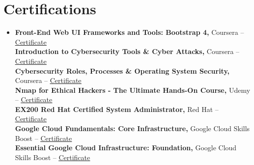 \documentclass[letterpaper,16pt]{article}
\newcommand{\resumeSubHeadingListStart}{\begin{itemize}[leftmargin=0.15in, label={}]}
\newcommand{\resumeSubHeadingListEnd}{\end{itemize}}
\begin{document}
\section{Certifications}
 \resumeSubHeadingListStart
   \item{
     \textbf{Front-End Web UI Frameworks and Tools: Bootstrap 4, }{Coursera -- \href{https://coursera.org/share/6f277b468374e3dbe6a26c67811db539}{\color{LinkCol}\underline{Certificate}}}
     \hfill \\
     \textbf{Introduction to Cybersecurity Tools \& Cyber Attacks, }{Coursera -- \href{https://coursera.org/share/317c6874e71c67cfde693de6e5de7e49}{\color{LinkCol}\underline{Certificate}}}
     \hfill \\
     \textbf{Cybersecurity Roles, Processes \& Operating System Security, }{Coursera -- \href{https://coursera.org/share/2ab125b6a50b05a2ed5eb454cce95afd}{\color{LinkCol}\underline{Certificate}}}
     \hfill \\
     \textbf{Nmap for Ethical Hackers - The Ultimate Hands-On Course, }{Udemy -- 
     \href{https://www.udemy.com/certificate/UC-bd741301-70d9-4a30-a11e-26f92aa1c287/}{\color{LinkCol}\underline{Certificate}}}
     \hfill \\
     \textbf{EX200 Red Hat Certified System Administrator, }{Red Hat -- \href{https://rhtapps.redhat.com/verify?certId=230-264-087}{\color{LinkCol}\underline{Certificate}}}
     \hfill \\
     \textbf{Google Cloud Fundamentals: Core Infrastructure, }{Google Cloud Skills Boost -- \href{https://www.cloudskillsboost.google/public_profiles/bd9c5896-4d7c-44d8-aa79-295b8944bf04/badges/4323872}{\color{LinkCol}\underline{Certificate}}}
     \hfill \\
     \textbf{Essential Google Cloud Infrastructure: Foundation, }{Google Cloud Skills Boost -- \href{https://www.cloudskillsboost.google/public_profiles/bd9c5896-4d7c-44d8-aa79-295b8944bf04/badges/4760001?utm_medium=social&utm_source=linkedin&utm_campaign=ql-social-share}{\color{LinkCol}\underline{Certificate}}}
   }
 \resumeSubHeadingListEnd
\end{document}
